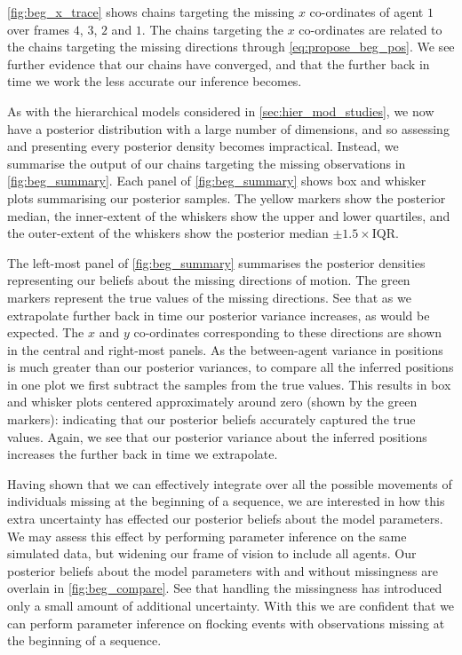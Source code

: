 \cref{fig:beg_x_trace} shows chains targeting the missing $x$ co-ordinates of
agent $1$ over frames $4$, $3$, $2$ and $1$. The chains targeting the $x$
co-ordinates are related to the chains targeting the missing directions through
\cref{eq:propose_beg_pos}. We see further evidence that our chains have
converged, and that the further back in time we work the less accurate our
inference becomes.

As with the hierarchical models considered in \cref{sec:hier_mod_studies}, we
now have a posterior distribution with a large number of dimensions, and so
assessing and presenting every posterior density becomes impractical. Instead,
we summarise the output of our chains targeting the missing observations in
\cref{fig:beg_summary}. Each panel of \cref{fig:beg_summary} shows box and
whisker plots summarising our posterior samples. The yellow markers show the
posterior median, the inner-extent of the whiskers show the upper and lower
quartiles, and the outer-extent of the whiskers show the posterior median
$\pm1.5\times\text{IQR}$.

The left-most panel of \cref{fig:beg_summary} summarises the posterior
densities representing our beliefs about the missing directions of motion. The
green markers represent the true values of the missing directions. See that as
we extrapolate further back in time our posterior variance increases, as would
be expected. The $x$ and $y$ co-ordinates corresponding to these directions are
shown in the central and right-most panels. As the between-agent variance in
positions is much greater than our posterior variances, to compare all the
inferred positions in one plot we first subtract the samples from the true
values. This results in box and whisker plots centered approximately around
zero (shown by the green markers): indicating that our posterior beliefs
accurately captured the true values. Again, we see that our posterior variance
about the inferred positions increases the further back in time we extrapolate.

Having shown that we can effectively integrate over all the possible movements
of individuals missing at the beginning of a sequence, we are interested in how
this extra uncertainty has effected our posterior beliefs about the model
parameters. We may assess this effect by performing parameter inference on the
same simulated data, but widening our frame of vision to include all agents.
Our posterior beliefs about the model parameters with and without missingness
are overlain in \cref{fig:beg_compare}. See that handling the missingness has
introduced only a small amount of additional uncertainty. With this we are
confident that we can perform parameter inference on flocking events with
observations missing at the beginning of a sequence.

